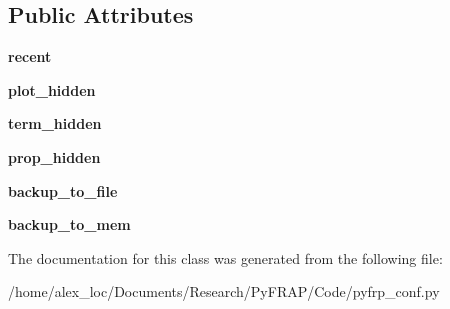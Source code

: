 \subsection*{Public Attributes}
\begin{DoxyCompactItemize}
\item 
\hypertarget{classpyfrp__conf_1_1pyfrp__conf_a3ec5a8c42f2e9e7b574caec3a9d11ca0}{{\bfseries recent}}\label{classpyfrp__conf_1_1pyfrp__conf_a3ec5a8c42f2e9e7b574caec3a9d11ca0}

\item 
\hypertarget{classpyfrp__conf_1_1pyfrp__conf_afa405b62c204b51b3e02ec24b2467f11}{{\bfseries plot\+\_\+hidden}}\label{classpyfrp__conf_1_1pyfrp__conf_afa405b62c204b51b3e02ec24b2467f11}

\item 
\hypertarget{classpyfrp__conf_1_1pyfrp__conf_a401d24d5c40a2af1f8b0007df8d89c97}{{\bfseries term\+\_\+hidden}}\label{classpyfrp__conf_1_1pyfrp__conf_a401d24d5c40a2af1f8b0007df8d89c97}

\item 
\hypertarget{classpyfrp__conf_1_1pyfrp__conf_a822b3aa6aea390a3bfc826aa494b78c2}{{\bfseries prop\+\_\+hidden}}\label{classpyfrp__conf_1_1pyfrp__conf_a822b3aa6aea390a3bfc826aa494b78c2}

\item 
\hypertarget{classpyfrp__conf_1_1pyfrp__conf_a5fd8e1244c0d3549c05d8e8660530181}{{\bfseries backup\+\_\+to\+\_\+file}}\label{classpyfrp__conf_1_1pyfrp__conf_a5fd8e1244c0d3549c05d8e8660530181}

\item 
\hypertarget{classpyfrp__conf_1_1pyfrp__conf_ab0ce62950a4a5f632d730d42f1463db2}{{\bfseries backup\+\_\+to\+\_\+mem}}\label{classpyfrp__conf_1_1pyfrp__conf_ab0ce62950a4a5f632d730d42f1463db2}

\end{DoxyCompactItemize}


The documentation for this class was generated from the following file\+:\begin{DoxyCompactItemize}
\item 
/home/alex\+\_\+loc/\+Documents/\+Research/\+Py\+F\+R\+A\+P/\+Code/pyfrp\+\_\+conf.\+py\end{DoxyCompactItemize}
